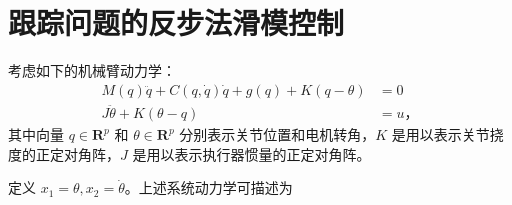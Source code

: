 \section{跟踪问题的反步法滑模控制}\label{6Fref}

考虑如下的机械臂动力学：
\begin{align*}
    M(q) \ddot{q} + C(q, \dot{q}) \dot{q} + g(q) + K (q - \theta) & = 0 \\
    J \ddot{\theta} + K (\theta - q) & = u \text{，}
\end{align*}
其中向量 $q \in \mathbf{R}^p$ 和 $\theta \in \mathbf{R}^p$ 分别表示关节位置和电机转角，$K$ 是用以表示关节挠度的正定对角阵，$J$ 是用以表示执行器惯量的正定对角阵。

定义 $x_1 = \theta, x_2 = \dot{\theta}$。上述系统动力学可描述为







